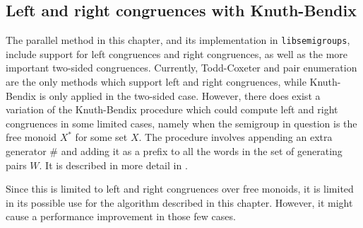 \subsection{Left and right congruences with Knuth-Bendix}
\label{sec:kb-l-r}
The parallel method in this chapter, and its implementation in
\texttt{libsemigroups}, include support for left congruences and right
congruences, as well as the more important two-sided congruences.  Currently,
Todd-Coxeter and pair enumeration are the only methods which support left and
right congruences, while Knuth-Bendix is only applied in the two-sided case.
However, there does exist a variation of the Knuth-Bendix procedure which could
compute left and right congruences in some limited cases, namely when the
semigroup in question is the free monoid $X^*$ for some set $X$.  The procedure
involves appending an extra generator $\#$ and adding it as a prefix to all the
words in the set of generating pairs $W$.  It is described in more detail in
\cite[\S 2.8]{sims}.

Since this is limited to left and right congruences over free monoids, it is
limited in its possible use for the algorithm described in this chapter.
However, it might cause a performance improvement in those few cases.


\clearpage

